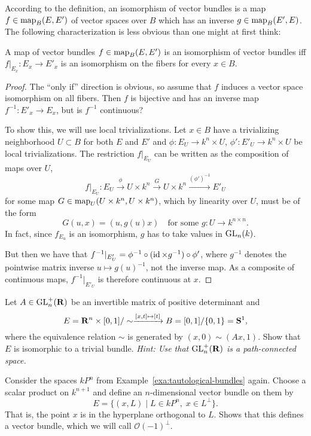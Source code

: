 \documentclass[a4paper,openany]{scrbook}
\begin{document}
According to the definition, an isomorphism of vector bundles is a map $f\in \operatorname{map}_B(E,E')$ of vector spaces over $B$ which has an inverse $g\in \operatorname{map}_B(E',E)$. The following characterization is less obvious than one might at first think:

\begin{thm} \label{thm:fiberwiseiso}
A map of vector bundles $f\in \operatorname{map}_B(E,E')$ is an isomorphism of vector bundles iff $f|_{E_x}\colon E_x \to E'_x$ is an isomorphism on the fibers for every $x \in B$.
\end{thm}
\begin{proof}
The “only if” direction is obvious, so assume that $f$ induces a vector space isomorphism on all fibers. Then $f$ is bijective and has an inverse map $f^{-1}\colon E'_x \to E_x$, but is $f^{-1}$ continuous?

To show this, we will use local trivializations. Let $x \in B$ have a trivializing neighborhood $U \subset B$ for both $E$ and $E'$ and $\phi\colon E_U \to k^n \times U$, $\phi'\colon E'_U \to k^n \times U$ be local trivializations. The restriction $f|_{E_U}$ can be written as the composition of maps over $U$,
\[
f|_{E_U}\colon E_U \xrightarrow{\phi} U \times k^n \xrightarrow{G} U \times k^n \xrightarrow{(\phi')^{-1}} E'_U
\]
for some map $G \in \operatorname{map}_U(U \times k^n,U \times k^n)$, which by linearity over $U$, must be of the form
\[
G(u,x) = (u,g(u)x) \quad \text{for some $g\colon U \to k^{n \times n}$}.
\]
In fact, since $f_{E_u}$ is an isomorphism, $g$ has to take values in $\operatorname{GL}_n(k)$.

But then we have that $f^{-1}|_{E'_U} = \phi^{-1} \circ (\operatorname{id} \times g^{-1}) \circ \phi'$, where $g^{-1}$ denotes the pointwise matrix inverse $u \mapsto g(u)^{-1}$, not the inverse map. As a composite of continuous maps, $f^{-1}|_{E'_U}$ is therefore continuous at $x$. 
\end{proof}

\begin{exer} \label{exer:higher-moebius}
Let $A \in \operatorname{GL}^+_n(\mathbf R)$ be an invertible matrix of positive determinant and
\[
E=\mathbf R^n \times [0,1]/\sim \xrightarrow{[x,t] \mapsto [t]} B=[0,1]/\{0,1\}=\mathbf S^1,
\]
where the equivalence relation $\sim$ is generated by $(x,0) \sim (Ax,1)$. Show that $E$ is isomorphic to a trivial bundle. \emph{Hint: Use that $\operatorname{GL}_n^+(\mathbf R)$ is a path-connected space.} 
\end{exer}

\begin{exer} \label{exer:complement-of-tautological-bundle}
Consider the spaces $kP^n$ from Example~\ref{exa:tautological-bundles} again. Choose a scalar product on $k^{n+1}$ and define an $n$-dimensional vector bundle on them by
\[
E = \{(x,L) \mid L \in kP^n,\; x \in L^\perp\}.
\]
That is, the point $x$ is in the hyperplane orthogonal to $L$. Shows that this defines a vector bundle, which we will call $\mathcal O(-1)^\perp$.
\end{exer}
\end{document}
